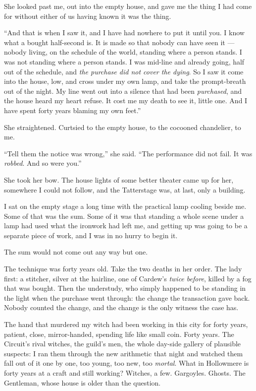She looked past me, out into the empty house, and gave me the thing I had come for without either of us having known it was the thing.

``And that is when I saw it, and I have had nowhere to put it until you. I know what a bought half-second is. It is made so that nobody can have seen it --- nobody living, on the schedule of the world, standing where a person stands. I was not standing where a person stands. I was mid-line and already going, half out of the schedule, and \emph{the purchase did not cover the dying}. So I saw it come into the house, low, and cross under my own lamp, and take the prompt-breath out of the night. My line went out into a silence that had been \emph{purchased}, and the house heard my heart refuse. It cost me my death to see it, little one. And I have spent forty years blaming my own feet.''

She straightened. Curtsied to the empty house, to the cocooned chandelier, to me.

``Tell them the notice was wrong,'' she said. ``The performance did not fail. It was \emph{robbed}. And so were you.''

She took her bow. The house lights of some better theater came up for her, somewhere I could not follow, and the Tatterstage was, at last, only a building.

\scenebreak

I sat on the empty stage a long time with the practical lamp cooling beside me. Some of that was the sum. Some of it was that standing a whole scene under a lamp had used what the ironwork had left me, and getting up was going to be a separate piece of work, and I was in no hurry to begin it.

The sum would not come out any way but one.

The technique was forty years old. Take the two deaths in her order. The lady first: a stitcher, silver at the hairline, one of Cardew's \emph{twice before}, killed by a fog that was bought. Then the understudy, who simply happened to be standing in the light when the purchase went through: the change the transaction gave back. Nobody counted the change, and the change is the only witness the case has.

The hand that murdered my witch had been working in this city for forty years, patient, close, mirror-handed, spending life like small coin. Forty years. The Circuit's rival witches, the guild's men, the whole day-side gallery of plausible suspects: I ran them through the new arithmetic that night and watched them fall out of it one by one, too young, too new, too \emph{mortal}. What in Hollowmere is forty years at a craft and still working? Witches, a few. Gargoyles. Ghosts. The Gentleman, whose house is older than the question.

